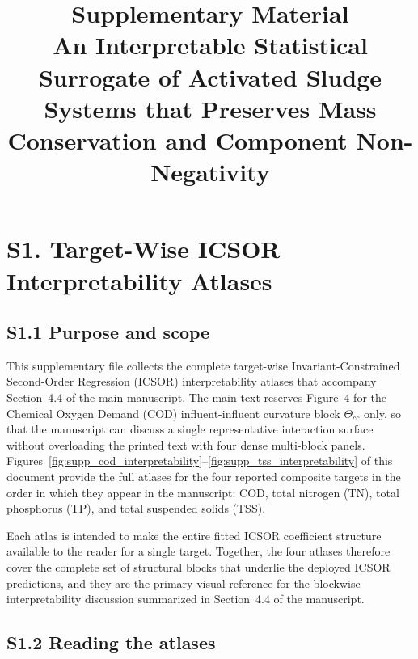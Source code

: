 \documentclass[a4paper,11pt]{article}
\title{Supplementary Material\\An Interpretable Statistical Surrogate of Activated Sludge Systems that Preserves Mass Conservation and Component Non-Negativity}
\author{}
\date{}
\begin{document}
\maketitle

\section*{S1. Target-Wise ICSOR Interpretability Atlases}

\subsection*{S1.1 Purpose and scope}

This supplementary file collects the complete target-wise Invariant-Constrained Second-Order Regression (ICSOR) interpretability atlases that accompany Section~4.4 of the main manuscript. The main text reserves Figure~4 for the Chemical Oxygen Demand (COD) influent-influent curvature block $\Theta_{cc}$ only, so that the manuscript can discuss a single representative interaction surface without overloading the printed text with four dense multi-block panels. Figures~\ref{fig:supp_cod_interpretability}--\ref{fig:supp_tss_interpretability} of this document provide the full atlases for the four reported composite targets in the order in which they appear in the manuscript: COD, total nitrogen (TN), total phosphorus (TP), and total suspended solids (TSS).

Each atlas is intended to make the entire fitted ICSOR coefficient structure available to the reader for a single target. Together, the four atlases therefore cover the complete set of structural blocks that underlie the deployed ICSOR predictions, and they are the primary visual reference for the blockwise interpretability discussion summarized in Section~4.4 of the manuscript.

\subsection*{S1.2 Reading the atlases}
\end{document}
